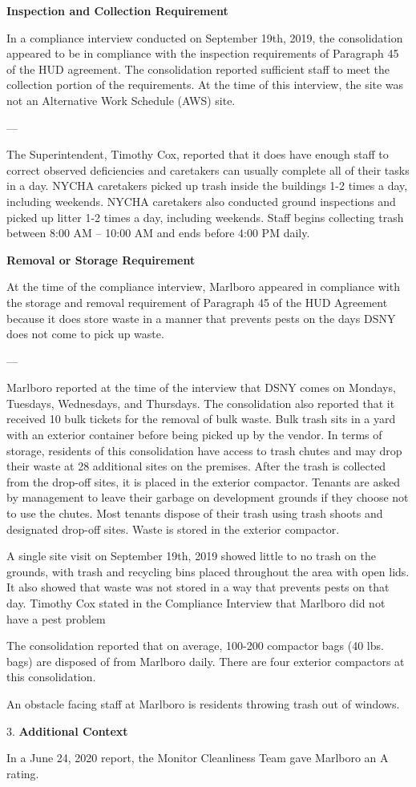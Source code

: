 

\textbf{Inspection and Collection Requirement}

In a compliance interview conducted on September 19th, 2019, the consolidation appeared to be in compliance with the inspection requirements of Paragraph 45 of the HUD agreement. The consolidation reported sufficient staff to meet the collection portion of the requirements. At the time of this interview, the site was not an Alternative Work Schedule (AWS) site. 

---

The Superintendent, Timothy Cox, reported that it does have enough staff to correct observed deficiencies and caretakers can usually complete all of their tasks in a day. NYCHA caretakers picked up trash inside the buildings 1-2 times a day, including weekends. NYCHA caretakers also conducted ground inspections and picked up litter 1-2 times a day, including weekends. Staff begins collecting trash between 8:00 AM -- 10:00 AM and ends before 4:00 PM daily. 

\textbf{Removal or Storage Requirement}

At the time of the compliance interview, Marlboro appeared in compliance with the storage and removal requirement of Paragraph 45 of the HUD Agreement because it does store waste in a manner that prevents pests on the days DSNY does not come to pick up waste. 

---

Marlboro reported at the time of the interview that DSNY comes on Mondays, Tuesdays, Wednesdays, and Thursdays. The consolidation also reported that it received 10 bulk tickets for the removal of bulk waste. Bulk trash sits in a yard with an exterior container before being picked up by the vendor. In terms of storage, residents of this consolidation have access to trash chutes and may drop their waste at 28 additional sites on the premises. After the trash is collected from the drop-off sites, it is placed in the exterior compactor. Tenants are asked by management to leave their garbage on development grounds if they choose not to use the chutes. Most tenants dispose of their trash using trash shoots and designated drop-off sites. Waste is stored in the exterior compactor. 

A single site visit on September 19th, 2019 showed little to no trash on the grounds, with trash and recycling bins placed throughout the area with open lids. It also showed that waste was not stored in a way that prevents pests on that day. Timothy Cox stated in the Compliance Interview that Marlboro did not have a pest problem 

The consolidation reported that on average, 100-200 compactor bags (40 lbs. bags) are disposed of from Marlboro daily. There are four exterior compactors at this consolidation.  

An obstacle facing staff at Marlboro is residents throwing trash out of windows. 

3. \textbf{Additional Context} 

In a June 24, 2020 report, the Monitor Cleanliness Team gave Marlboro an A rating. 